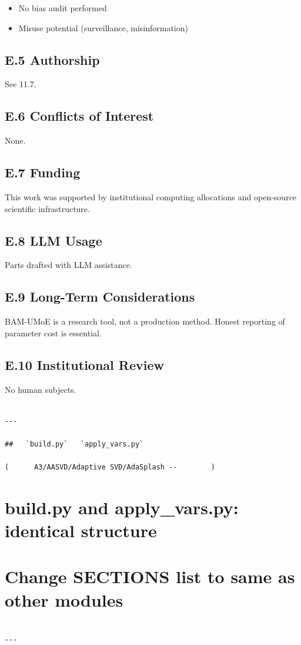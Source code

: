 \begin{itemize}
\item No bias audit performed
\item Misuse potential (surveillance, misinformation)

\end{itemize}
\subsection{E.5 Authorship}

See  11.7.

\subsection{E.6 Conflicts of Interest}

None.

\subsection{E.7 Funding}

This work was supported by institutional computing allocations and open-source scientific infrastructure.

\subsection{E.8 LLM Usage}

Parts drafted with LLM assistance.

\subsection{E.9 Long-Term Considerations}

BAM-UMoE is a research tool, not a production method. Honest reporting 
of parameter cost is essential.

\subsection{E.10 Institutional Review}

No human subjects.
\begin{lstlisting}

---

##   `build.py`   `apply_vars.py`

(      A3/AASVD/Adaptive SVD/AdaSplash --        )

\end{lstlisting}
\section{build.py and apply\_vars.py: identical structure}
\section{Change SECTIONS list to same as other modules}
\begin{lstlisting}

---
\end{lstlisting}